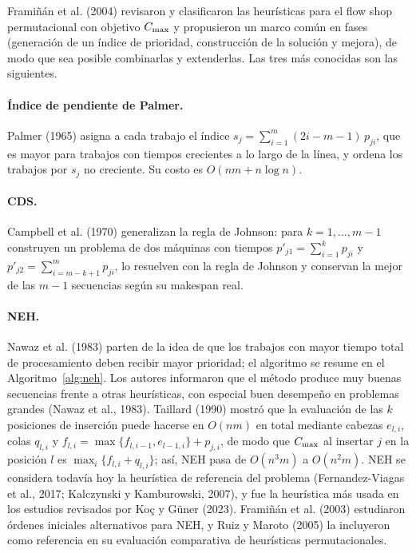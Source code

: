 Framiñán et al. (2004) revisaron y clasificaron las heurísticas para el flow shop
permutacional con objetivo $C_{\max}$ y propusieron un marco común en fases (generación de
un índice de prioridad, construcción de la solución y mejora), de modo que sea posible
combinarlas y extenderlas. Las tres más conocidas son las siguientes.

\paragraph{Índice de pendiente de Palmer.} Palmer (1965) asigna a cada trabajo el índice
$s_j=\sum_{i=1}^{m}(2i-m-1)\,p_{ji}$, que es mayor para trabajos con tiempos crecientes a
lo largo de la línea, y ordena los trabajos por $s_j$ no creciente. Su costo es
$O(nm+n\log n)$.

\paragraph{CDS.} Campbell et al. (1970) generalizan la regla de Johnson: para
$k=1,\ldots,m-1$ construyen un problema de dos máquinas con tiempos
$p'_{j1}=\sum_{i=1}^{k}p_{ji}$ y $p'_{j2}=\sum_{i=m-k+1}^{m}p_{ji}$, lo resuelven con la regla
de Johnson y conservan la mejor de las $m-1$ secuencias según su makespan real.

\paragraph{NEH.} Nawaz et al. (1983) parten de la idea de que los trabajos con mayor tiempo
total de procesamiento deben recibir mayor prioridad; el algoritmo se resume en el
Algoritmo~\ref{alg:neh}. Los autores informaron que el método produce muy buenas secuencias
frente a otras heurísticas, con especial buen desempeño en problemas grandes (Nawaz et al.,
1983). Taillard (1990) mostró que la evaluación de las $k$ posiciones de inserción puede
hacerse en $O(nm)$ en total mediante cabezas $e_{l,i}$, colas $q_{l,i}$ y
$f_{l,i}=\max\{f_{l,i-1},e_{l-1,i}\}+p_{j,i}$, de modo que
$C_{\max}$ al insertar $j$ en la posición $l$ es $\max_i\{f_{l,i}+q_{l,i}\}$; así, NEH pasa de
$O(n^3m)$ a $O(n^2m)$. NEH se considera todavía hoy la heurística de referencia del problema
(Fernandez-Viagas et al., 2017; Kalczynski y Kamburowski, 2007), y fue la heurística más
usada en los estudios revisados por Koç y Güner (2023). Framiñán et al. (2003) estudiaron
órdenes iniciales alternativos para NEH, y Ruiz y Maroto (2005) la incluyeron como
referencia en su evaluación comparativa de heurísticas permutacionales.

